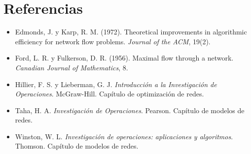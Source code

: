 \documentclass[11pt,a4paper]{article}
\begin{document}
\section*{Referencias}
\begin{itemize}[leftmargin=*, itemsep=3pt]
  \item Edmonds, J. y Karp, R. M. (1972). Theoretical improvements in algorithmic efficiency for network flow problems. \textit{Journal of the ACM}, 19(2).
  \item Ford, L. R. y Fulkerson, D. R. (1956). Maximal flow through a network. \textit{Canadian Journal of Mathematics}, 8.
  \item Hillier, F. S. y Lieberman, G. J. \textit{Introducción a la Investigación de Operaciones}. McGraw-Hill. Capítulo de optimización de redes.
  \item Taha, H. A. \textit{Investigación de Operaciones}. Pearson. Capítulo de modelos de redes.
  \item Winston, W. L. \textit{Investigación de operaciones: aplicaciones y algoritmos}. Thomson. Capítulo de modelos de redes.
\end{itemize}
\end{document}
